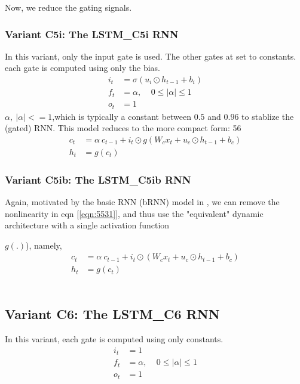 \documentclass{article}
\begin{document}
{{{{Now, we reduce the gating signals.

\subsubsection{Variant C5i: The LSTM\_C5i RNN}
In this variant, only the input gate is used. The other gates at set to constants. each gate is computed using only the bias.
\begin{align}
	i_t &= \sigma(u_i \odot  h_{t-1} + b_i)\\
	f_t &= \alpha , ~~~~~  0 \leq |\alpha| \leq  1 \\
	o_t &= 1
\end{align}
$\alpha, ~ |\alpha | <= 1$,which is typically a constant between $0.5$ and $0.96$ to stablize the (gated) RNN.
This model reduces to the more compact form: 56
\begin{align}
	\label{eqn:5iC31}	 c_t &=  \alpha ~ c_{t-1} + i_t \odot g(W_c x_t + u_c \odot  h_{t-1} + b_c)\\
	\label{eqn:5iC41}	h_t &=  g(c_t)
\end{align}

\subsubsection{Variant C5ib: The LSTM\_C5ib RNN}
Again, motivated by the basic RNN (bRNN) model in \cite {salem2016basic}, we can remove the nonlinearity in eqn [\ref{eqn:5531}], and thus use the "equivalent" dynamic architecture with a single activation function {$g(.)$), namely,
\begin{align}
	\label{eqn:5ibC531}	c_t &=  \alpha ~ c_{t-1} + i_t \odot (W_c x_t + u_c \odot  h_{t-1} + b_c)\\
	\label{eqn:5ibC541}	h_t &=  g(c_t)
\end{align}
\\

\subsection{Variant C6: The LSTM\_C6 RNN}
In this variant, each gate is computed using only constants.
\begin{align}
	i_t &= 1 \\
	f_t &= \alpha , ~~~~~  0 \leq |\alpha| \leq  1 \\
	o_t &= 1
\end{align}

}}}}}
\end{document}
